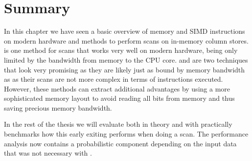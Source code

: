 \section{Summary}

In this chapter we have seen a basic overview of memory and SIMD instructions on
modern hardware and methods to perform scans on in-memory column stores.
\simdscan{} is one method for scans that works very well on modern hardware,
being only limited by the bandwidth from memory to the CPU core. \bwv{} and
\bs{} are two techniques that look very promising as they are likely just as
bound by memory bandwidth as \simdscan{} as their scans are not more complex in
terms of instructions executed. However, these methods can extract additional
advantages by using a more sophisticated memory layout to avoid reading all bits
from memory and thus saving precious memory bandwidth.

In the rest of the thesis we will evaluate both in theory and with practically
benchmarks how this early exiting performs when doing a scan. The performance
analysis now contains a probabilistic component depending on the input data that
was not necessary with \simdscan{}.

